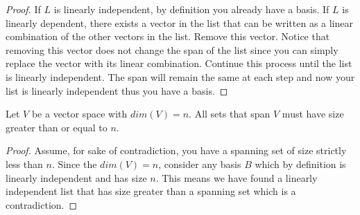 \begin{proof}
    If $L$ is linearly independent, by definition you already have a basis. If $L$ is linearly dependent, there exists a vector in the list that can be written as a linear combination of the other vectors in the list. Remove this vector. Notice that removing this vector does not change the span of the list since you can simply replace the vector with its linear combination. Continue this process until the list is linearly independent. The span will remain the same at each step and now your list is linearly independent thus you have a basis.
\end{proof}
\begin{exercise}
    Let $V$ be a vector space with $dim(V)=n$. All sets that span $V$ must have size greater than or equal to $n$.
\end{exercise}
\begin{proof}
    Assume, for sake of contradiction, you have a spanning set of size strictly less than $n$. Since the $dim(V)=n$, consider any basis $B$ which by definition is linearly independent and has size $n$. This means we have found a linearly independent list that has size greater than a spanning set which is a contradiction.
\end{proof}